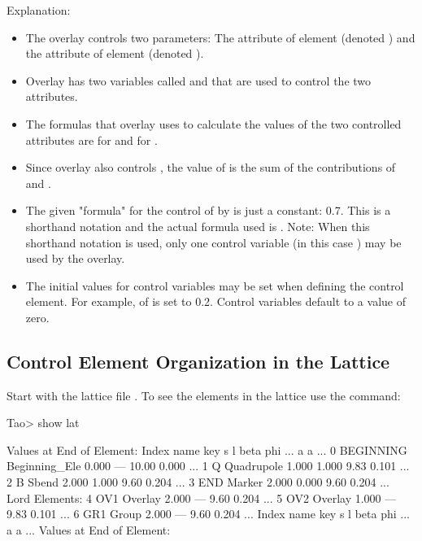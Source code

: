 \documentclass{hitec}     %
\begin{document}
{{{{Explanation:
\vspace{-5 pt}
\begin{itemize}[leftmargin=*]
%
\item
The overlay  controls two parameters: 
The  attribute of element  (denoted ) and the  attribute of element
 (denoted ).
\item
Overlay  has two variables called  and  that are used to control the two attributes.
\item
The formulas that overlay  uses to calculate the values of the two controlled
attributes are  for  and  for .
\item 
Since overlay  also controls , the value of  is the sum of the
contributions of  and .
\item
The given "formula" for the control of  by  is just a constant: 0.7.  This is a
shorthand notation and the actual formula used is .  Note: When this shorthand notation
is used, only one control variable (in this case ) may be used by the overlay.
\item
The initial values for control variables may be set when defining the control element. For example,
 of  is set to 0.2. Control variables default to a value of zero.
\end{itemize}

\subsection{Control Element Organization in the Lattice}

Start \tao with the lattice file . To see the elements in the lattice use the  command:
\begin{code}
Tao> show lat

      Values at End of Element:
 Index  name      key                       s       l    beta     phi ...
                                                            a       a ...
     0  BEGINNING Beginning_Ele         0.000     ---   10.00   0.000 ...
     1  Q         Quadrupole            1.000   1.000    9.83   0.101 ...
     2  B         Sbend                 2.000   1.000    9.60   0.204 ...
     3  END       Marker                2.000   0.000    9.60   0.204 ...
Lord Elements:
     4  OV1       Overlay               2.000     ---    9.60   0.204 ...
     5  OV2       Overlay               1.000     ---    9.83   0.101 ...
     6  GR1       Group                 2.000     ---    9.60   0.204 ...
 Index  name      key                       s       l    beta     phi ...
                                                            a       a ...
      Values at End of Element:
\end{code}

}}}}
\end{document}
